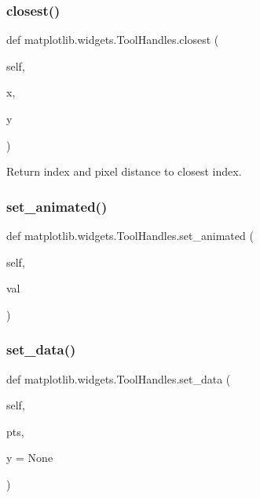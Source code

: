 \subsubsection{\texorpdfstring{closest()}{closest()}}
{\footnotesize\ttfamily def matplotlib.\+widgets.\+Tool\+Handles.\+closest (\begin{DoxyParamCaption}\item[{}]{self,  }\item[{}]{x,  }\item[{}]{y }\end{DoxyParamCaption})}

\begin{DoxyVerb}Return index and pixel distance to closest index.\end{DoxyVerb}
 \mbox{\label{classmatplotlib_1_1widgets_1_1ToolHandles_a0d16f07e5a01563666e5b3e42a159cff}} 
\subsubsection{\texorpdfstring{set\+\_\+animated()}{set\_animated()}}
{\footnotesize\ttfamily def matplotlib.\+widgets.\+Tool\+Handles.\+set\+\_\+animated (\begin{DoxyParamCaption}\item[{}]{self,  }\item[{}]{val }\end{DoxyParamCaption})}

\mbox{\label{classmatplotlib_1_1widgets_1_1ToolHandles_ab2dce770645e7a0f6040378be81cedc1}} 
\subsubsection{\texorpdfstring{set\+\_\+data()}{set\_data()}}
{\footnotesize\ttfamily def matplotlib.\+widgets.\+Tool\+Handles.\+set\+\_\+data (\begin{DoxyParamCaption}\item[{}]{self,  }\item[{}]{pts,  }\item[{}]{y = {\ttfamily None} }\end{DoxyParamCaption})}

